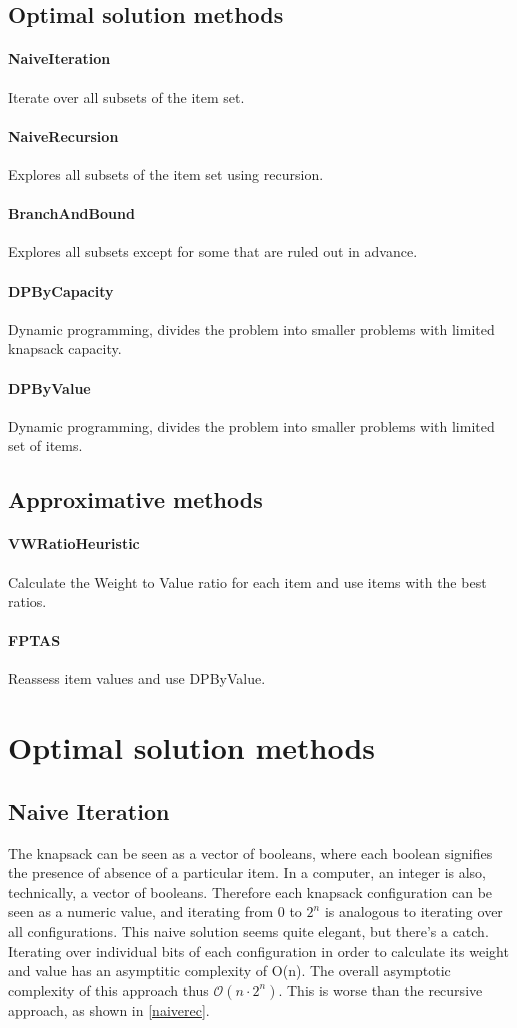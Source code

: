 \documentclass[a4paper,10pt,twocolumn]{article}
\begin{document}
\subsection{Optimal solution methods}
\paragraph{NaiveIteration} Iterate over all subsets of the item set.
\paragraph{NaiveRecursion} Explores all subsets of the item set using recursion.
\paragraph{BranchAndBound} Explores all subsets except for some that are ruled out in advance.
\paragraph{DPByCapacity} Dynamic programming, divides the problem into smaller problems with limited knapsack capacity.
\paragraph{DPByValue} Dynamic programming, divides the problem into smaller problems with limited set of items.

\subsection{Approximative methods}
\paragraph{VWRatioHeuristic} Calculate the Weight to Value ratio for each item and use items with the best ratios.
\paragraph{FPTAS} Reassess item values and use DPByValue.

\section{Optimal solution methods}
\subsection{Naive Iteration}
The knapsack can be seen as a vector of booleans, where each boolean signifies the presence of absence of a particular
item. In a computer, an integer is also, technically, a vector of booleans. Therefore each knapsack configuration can be
seen as a numeric value, and iterating from $0$ to $2^n$ is analogous to iterating over all configurations. This naive
solution seems quite elegant, but there's a catch. Iterating over individual bits of each configuration in order to
calculate its weight and value has an asymptitic complexity of O(n). The overall asymptotic complexity of this approach
thus $\mathcal{O}(n\cdot2^n)$. This is worse than the recursive approach, as shown in \ref{naiverec}.
\end{document}
